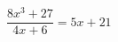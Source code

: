 \begin{ex}[type=equation]
	\begin{condition}
		$\dfrac{8x^3 + 27}{4x + 6} = 5x + 21$
	\end{condition}
\end{ex}
